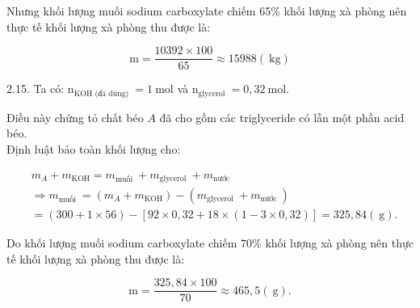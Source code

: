 \documentclass[10pt]{article}
\begin{document}
Nhưng khối lượng muối sodium carboxylate chiếm 65\% khối lượng xà phòng nên thực tế khối lượng xà phòng thu được là:

$$
\mathrm{m}=\frac{10392 \times 100}{65} \approx 15988(\mathrm{~kg})
$$

2.15. Ta có: $\mathrm{n}_{\mathrm{KOH} \text { (đä düng) }}=1 \mathrm{~mol}$ và $\mathrm{n}_{\text {glycerol }}=0,32 \mathrm{~mol}$.

Điều này chứng tỏ chất béo $A$ đã cho gồm các triglyceride có lẫn một phần acid béo.\\
Định luật bảo toàn khối lượng cho:

$$
\begin{aligned}
& m_{A}+m_{\mathrm{KOH}}=m_{\text {muối }}+m_{\text {glycerol }}+m_{\text {nước }} \\
& \Rightarrow m_{\text {muối }}=\left(m_{A}+m_{\mathrm{KOH}}\right)-\left(m_{\text {glycerol }}+m_{\text {nước }}\right) \\
& =(300+1 \times 56)-[92 \times 0,32+18 \times(1-3 \times 0,32)]=325,84(\mathrm{~g}) .
\end{aligned}
$$

Do khối lượng muối sodium carboxylate chiếm $70 \%$ khối lượng xà phòng nên thực tế khối lượng xà phòng thu được là:

$$
\mathrm{m}=\frac{325,84 \times 100}{70} \approx 465,5(\mathrm{~g}) .
$$
\end{document}
